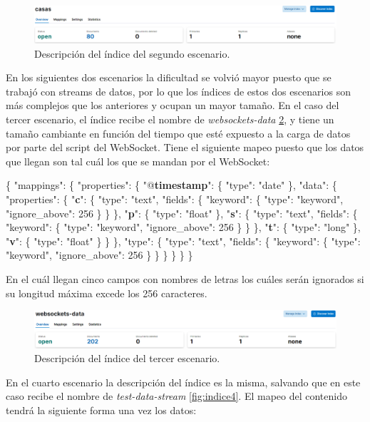 \begin{figure}
    \centering
    \includegraphics[width=1\linewidth]{img/indice2.png}
    \caption{Descripción del índice del segundo escenario.}
    \label{fig:indice2}
\end{figure}

En los siguientes dos escenarios la dificultad se volvió mayor puesto que se trabajó con streams de datos, por lo que los índices de estos dos escenarios son más complejos que los anteriores y ocupan un mayor tamaño. En el caso del tercer escenario, el índice recibe el nombre de \textit{websockets-data} \ref{fig:indice3}, y tiene un tamaño cambiante en función del tiempo que esté expuesto a la carga de datos por parte del script del WebSocket. Tiene el siguiente mapeo puesto que los datos que llegan son tal cuál los que se mandan por el WebSocket:

\{ "mappings": \{ "properties": \{ "@\textbf{timestamp}": \{ "type": "date" \}, "data": \{ "properties": \{ "\textbf{c}": \{ "type": "text", "fields": \{ "keyword": \{ "type": "keyword", "ignore\_above": 256 \} \} \}, "\textbf{p}": \{ "type": "float" \}, "\textbf{s}": \{ "type": "text", "fields": \{ "keyword": \{ "type": "keyword", "ignore\_above": 256 \} \} \}, "\textbf{t}": \{ "type": "long" \}, "\textbf{v}": \{ "type": "float" \} \} \}, "type": \{ "type": "text", "fields": \{ "keyword": \{ "type": "keyword", "ignore\_above": 256 \} \} \} \} \} \} 

En el cuál llegan cinco campos con nombres de letras los cuáles serán ignorados si su longitud máxima excede los 256 caracteres.

\begin{figure}
    \centering
    \includegraphics[width=1\linewidth]{img/indice3.png}
    \caption{Descripción del índice del tercer escenario.}
    \label{fig:indice3}
\end{figure}

En el cuarto escenario la descripción del índice es la misma, salvando que en este caso recibe el nombre de \textit{test-data-stream} \ref{fig:indice4}. El mapeo del contenido tendrá la siguiente forma una vez los datos: 

